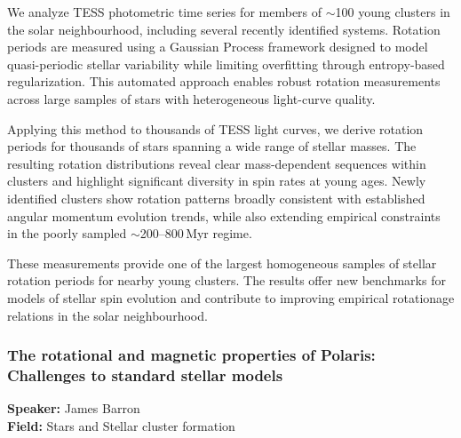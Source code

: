 We analyze TESS photometric time series for members of $\sim$100 young clusters in the solar neighbourhood, including several recently identified systems. Rotation periods are measured using a Gaussian Process framework designed to model quasi-periodic stellar variability while limiting overfitting through entropy-based regularization. This automated approach enables robust rotation measurements across large samples of stars with heterogeneous light-curve quality.

Applying this method to thousands of TESS light curves, we derive rotation periods for thousands of stars spanning a wide range of stellar masses. The resulting rotation distributions reveal clear mass-dependent sequences within clusters and highlight significant diversity in spin rates at young ages. Newly identified clusters show rotation patterns broadly consistent with established angular momentum evolution trends, while also extending empirical constraints in the poorly sampled $\sim$200--800\,Myr regime.

These measurements provide one of the largest homogeneous samples of stellar rotation periods for nearby young clusters. The results offer new benchmarks for models of stellar spin evolution and contribute to improving empirical rotationage relations in the solar neighbourhood.

\hypertarget{abstract-talk-121}{}\label{abstract-page-talk-121}
\subsubsection*{The rotational and magnetic properties of Polaris: Challenges to standard stellar models}
\textbf{Speaker:} James Barron\\
\textbf{Field:} Stars and Stellar cluster formation

